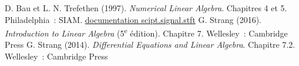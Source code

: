 \documentclass[a4paper, 11pt]{article}
\begin{document}
\begin{thebibliography}{00}
    D. Bau et L. N. Trefethen (1997). \textit{Numerical Linear Algebra}. Chapitres 4 et 5. Philadelphia~: SIAM.
    \href{https://docs.scipy.org/doc/scipy/reference/generated/scipy.signal.stft.html}{documentation scipt.signal.stft}
     G. Strang (2016). \textit{Introduction to Linear Algebra} (5\textsuperscript{e} édition). Chapitre 7. Wellesley~: Cambridge Press
     G. Strang (2014). \textit{Differential Equations and Linear Algebra}. Chapitre 7.2. Wellesley~: Cambridge Press
\end{thebibliography}
\end{document}

